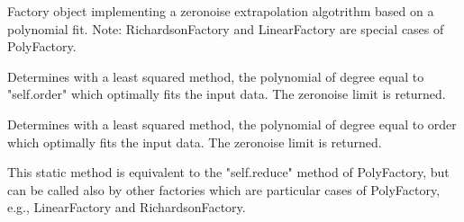 \documentclass[letterpaper,10pt,english]{sphinxmanual}
\begin{document}

\begin{fulllineitems}
\label{\detokenize{index:mitiq.factories.PolyFactory}}
Factory object implementing a zero\sphinxhyphen{}noise extrapolation algotrithm based on a polynomial fit.
Note: RichardsonFactory and LinearFactory are special cases of PolyFactory.

\begin{fulllineitems}
\label{\detokenize{index:mitiq.factories.PolyFactory.reduce}}
Determines with a least squared method, the polynomial of degree equal to "self.order"
which optimally fits the input data. The zero\sphinxhyphen{}noise limit is returned.

\end{fulllineitems}


\begin{fulllineitems}
\label{\detokenize{index:mitiq.factories.PolyFactory.static_reduce}}
Determines with a least squared method, the polynomial of degree equal to \textquotesingle{}order\textquotesingle{}
which optimally fits the input data. The zero\sphinxhyphen{}noise limit is returned.

This static method is equivalent to the "self.reduce" method of PolyFactory, but
can be called also by other factories which are particular cases of PolyFactory,
e.g., LinearFactory and RichardsonFactory.

\end{fulllineitems}


\end{fulllineitems}

\end{document}

